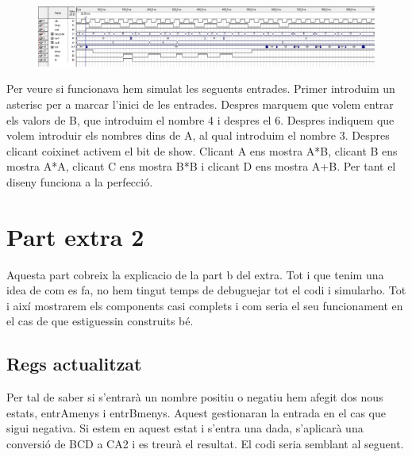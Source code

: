 \documentclass[12pt, a4papre]{article}
\begin{document}
	\begin{figure}[H]
		\begin{center}
		\includegraphics[width=130mm]{SimPpalExtra.jpeg}
		\end{center}
	\end{figure}
	
	Per veure si funcionava hem simulat les seguents entrades. Primer introduim un asterisc per a marcar l'inici de les entrades. Despres marquem que volem entrar els valors de B, que introduim el nombre 4 i despres el 6. Despres indiquem que volem introduir els nombres dins de A, al qual introduim el nombre 3. Despres clicant coixinet activem el bit de show. Clicant A ens mostra A*B, clicant B ens mostra A*A, clicant C ens mostra B*B i clicant D ens mostra A+B. Per tant el diseny funciona a la perfecció.
	
	

\section{Part extra 2}

Aquesta part cobreix la explicacio de la part b del extra. Tot i que tenim una idea de com es fa, no hem tingut temps de debuguejar tot el codi i simularho. Tot i així mostrarem els components casi complets i com seria el seu funcionament en el cas de que estiguessin construits bé.

\subsection{Regs actualitzat}

Per tal de saber si s'entrarà un nombre positiu o negatiu hem afegit dos nous estats, entrAmenys i entrBmenys. Aquest gestionaran la entrada en el cas que sigui negativa. Si estem en aquest estat i s'entra una dada, s'aplicarà una conversió de BCD a CA2 i es treurà el resultat. El codi seria semblant al seguent.
\end{document}
